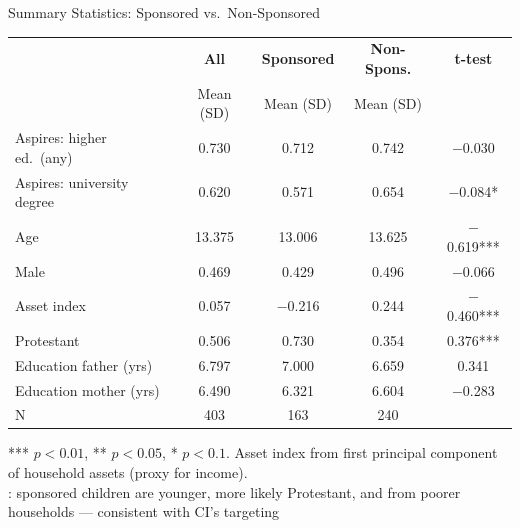 \documentclass[aspectratio=169, 10pt]{beamer}
\begin{document}
\begin{frame}{Summary Statistics: Sponsored vs.\ Non-Sponsored}
  \begin{center}
  \begin{tabular}{lcccc}
    \toprule
    & \textbf{All} & \textbf{Sponsored} & \textbf{Non-Spons.} & \textbf{t-test} \\
    & Mean (SD) & Mean (SD) & Mean (SD) & \\
    \midrule
    Aspires: higher ed.\ (any)  & 0.730 & 0.712 & 0.742 & $-$0.030 \\
    Aspires: university degree  & 0.620 & 0.571 & 0.654 & $-$0.084* \\
    Age  & 13.375 & 13.006 & 13.625 & $-$0.619*** \\
    Male  & 0.469 & 0.429 & 0.496 & $-$0.066 \\
    Asset index  & 0.057 & $-$0.216 & 0.244 & $-$0.460*** \\
    Protestant  & 0.506 & 0.730 & 0.354 & 0.376*** \\
    Education father (yrs)  & 6.797 & 7.000 & 6.659 & 0.341 \\
    Education mother (yrs)  & 6.490 & 6.321 & 6.604 & $-$0.283 \\
    N  & 403 & 163 & 240 & \\
    \bottomrule
  \end{tabular}
  \end{center}
  \vspace{0.3em}
  \begin{small}
    *** $p{<}0.01$, ** $p{<}0.05$, * $p{<}0.1$. Asset index from first principal component of household assets (proxy for income).\\
    : sponsored children are younger, more likely Protestant, and from poorer households — consistent with CI's targeting
  \end{small}
\end{frame}
\end{document}
